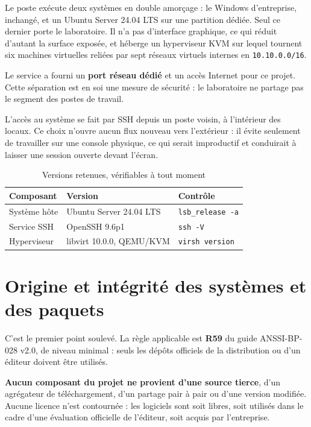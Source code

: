\documentclass[11pt,a4paper]{article}
\newcommand{\ttb}[1]{\texttt{\small #1}}
\newcommand{\anssi}[1]{\textcolor{primary}{\textbf{#1}}}
\begin{document}
Le poste exécute deux systèmes en double amorçage : le Windows d'entreprise,
inchangé, et un Ubuntu Server 24.04 LTS sur une partition dédiée. Seul ce dernier
porte le laboratoire. Il n'a pas d'interface graphique, ce qui réduit d'autant la
surface exposée, et héberge un hyperviseur KVM sur lequel tournent six machines
virtuelles reliées par sept réseaux virtuels internes en \ttb{10.10.0.0/16}.

Le service a fourni un \textbf{port réseau dédié} et un accès Internet pour ce
projet. Cette séparation est en soi une mesure de sécurité : le laboratoire ne
partage pas le segment des postes de travail.

L'accès au système se fait par SSH depuis un poste voisin, à l'intérieur des
locaux. Ce choix n'ouvre aucun flux nouveau vers l'extérieur : il évite seulement
de travailler sur une console physique, ce qui serait improductif et conduirait à
laisser une session ouverte devant l'écran.

\begin{table}[H]
\centering
\caption{Versions retenues, vérifiables à tout moment}
\begin{tabularx}{\textwidth}{@{}L{4.6cm}L{4.4cm}Y@{}}
\toprule
\textbf{Composant} & \textbf{Version} & \textbf{Contrôle} \\
\midrule
Système hôte & Ubuntu Server 24.04 LTS & \ttb{lsb\_release -a} \\
Service SSH & OpenSSH 9.6p1 & \ttb{ssh -V} \\
Hyperviseur & libvirt 10.0.0, QEMU/KVM & \ttb{virsh version} \\
\bottomrule
\end{tabularx}
\end{table}

\section{Origine et intégrité des systèmes et des paquets}

C'est le premier point soulevé. La règle applicable est \anssi{R59} du guide
ANSSI-BP-028 v2.0, de niveau minimal : seuls les dépôts officiels de la
distribution ou d'un éditeur doivent être utilisés.

\textbf{Aucun composant du projet ne provient d'une source tierce}, d'un
agrégateur de téléchargement, d'un partage pair à pair ou d'une version modifiée.
Aucune licence n'est contournée : les logiciels sont soit libres, soit utilisés
dans le cadre d'une évaluation officielle de l'éditeur, soit acquis par
l'entreprise.
\end{document}

